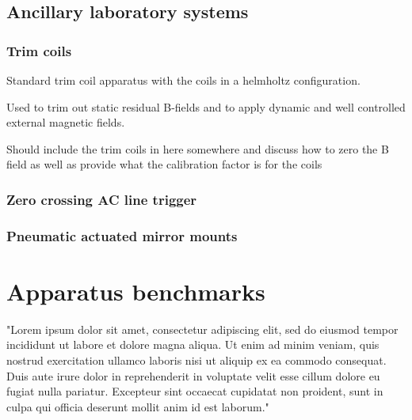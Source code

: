 \subsection{Ancillary laboratory systems}
\label{ssec:misc_sys}

\subsubsection{Trim coils}

Standard trim coil apparatus with the coils in a helmholtz configuration.

Used to trim out static residual B-fields and to apply dynamic and well controlled external magnetic fields.

Should include the trim coils in here somewhere and discuss how to zero the B field as well as provide what the calibration factor is for the coils

\subsubsection{Zero crossing AC line trigger}

\subsubsection{Pneumatic actuated mirror mounts}

\section{Apparatus benchmarks}
\label{sec:app_scores}

"Lorem ipsum dolor sit amet, consectetur adipiscing elit, sed do eiusmod tempor incididunt ut labore et dolore magna aliqua. Ut enim ad minim veniam, quis nostrud exercitation ullamco laboris nisi ut aliquip ex ea commodo consequat. Duis aute irure dolor in reprehenderit in voluptate velit esse cillum dolore eu fugiat nulla pariatur. Excepteur sint occaecat cupidatat non proident, sunt in culpa qui officia deserunt mollit anim id est laborum."